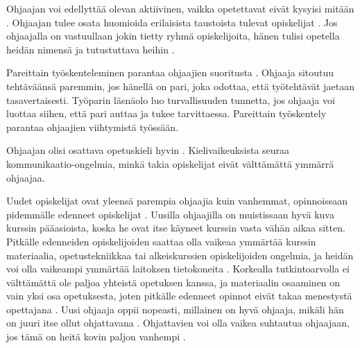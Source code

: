 \documentclass[finnish]{tktltiki2}
\theoremstyle{definition}
\theoremstyle{remark}
\begin{document}
Ohjaajan voi edellyttää olevan aktiivinen, vaikka opetettavat eivät kysyisi mitään \cite{Vikberg}. Ohjaajan tulee osata huomioida erilaisista taustoista tulevat opiskelijat \cite{Kay98}. Jos ohjaajalla on vastuullaan jokin tietty ryhmä opiskelijoita, hänen tulisi opetella heidän nimensä ja tutustuttava heihin \cite{Bernstein}. \par

Pareittain työskenteleminen parantaa ohjaajien suoritusta \cite{Patitsas12_3}. Ohjaaja sitoutuu tehtäväänsä paremmin, jos hänellä on pari, joka odottaa, että työtehtävät jaetaan tasavertaisesti. Työparin läsnäolo luo turvallisuuden tunnetta, jos ohjaaja voi luottaa siihen, että pari auttaa ja tukee tarvittaessa. Pareittain työskentely parantaa ohjaajien viihtymistä työssään. \par

Ohjaajan olisi osattava opetuskieli hyvin \cite{Richards00}. Kielivaikeuksista seuraa kom\-mu\-ni\-kaa\-tio-on\-gel\-mia, minkä takia opiskelijat eivät välttämättä ymmärrä ohjaajaa. \par

Uudet opiskelijat ovat yleensä parempia ohjaajia kuin vanhemmat, opinnoissaan pidemmälle edenneet opiskelijat \cite{Dickson11}. Uusilla ohjaajilla on muistissaan hyvä kuva kurssin pääasioista, koska he ovat itse käyneet kurssin vasta vähän aikaa sitten. Pitkälle edenneiden opiskelijoiden saattaa olla vaikeaa ymmärtää kurssin materiaalia, opetustekniikkaa tai alkeiskurssien opiskelijoiden ongelmia, ja heidän voi olla vaikeampi ymmärtää laitoksen tietokoneita \cite{Reges88}. Korkealla tutkintoarvolla ei välttämättä ole paljoa yhteistä opetuksen kanssa, ja materiaalin osaaminen on vain yksi osa opetuksesta, joten pitkälle edenneet opinnot eivät takaa menestystä opettajana \cite{Baldwin00}. Uusi ohjaaja oppii nopeasti, millainen on hyvä ohjaaja, mikäli hän on juuri itse ollut ohjattavana \cite{Vihavainen, Vikberg}. Ohjattavien voi olla vaikea suhtautua ohjaajaan, jos tämä on heitä kovin paljon vanhempi \cite{Decker06}. \par
\end{document}
